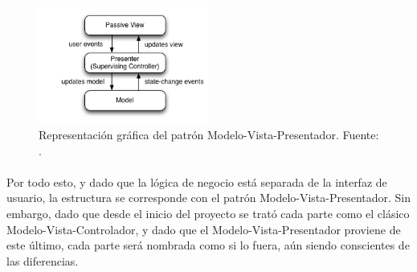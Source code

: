 \documentclass{subfiles}
\begin{document}
        \begin{figure}
        \centering
        \includegraphics[width=0.5\textwidth]{img/mvp.png}
        \caption{Representación gráfica del patrón Modelo-Vista-Presentador. Fuente: .}
        \label{fig:mvp}
        \end{figure}

        \paragraph{}
        Por todo esto, y dado que la lógica de negocio está separada de la interfaz de usuario, la estructura se corresponde con el patrón Modelo-Vista-Presentador. Sin embargo, dado que desde el inicio del proyecto se trató cada parte como el clásico Modelo-Vista-Controlador, y dado que el Modelo-Vista-Presentador proviene de este último, cada parte será nombrada como si lo fuera, aún siendo conscientes de las diferencias.
\end{document}

